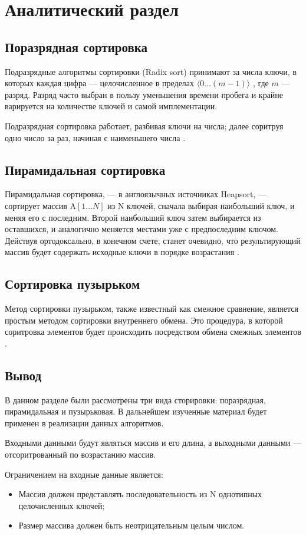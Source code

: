 \chapter{Аналитический раздел}
\label{cha:analysis}
%
%

\section{Поразрядная сортировка}
Подразрядные алгоритмы сортировки (Radix sort) принимают за числа ключи, в которых каждая цифра --- целочисленное в пределах $\langle 0\dots(m - 1) \rangle$
, где $m$ --- разряд. Разряд часто выбран в пользу уменьшения времени пробега и крайне варируется на количестве ключей и самой имплементации.

Подразрядная сортировка работает, разбивая ключи на числа; далее соритруя одно число за раз, начиная с наименьшего числа \cite{zagha1991radix}.
\section{Пирамидальная сортировка}
Пирамидальная сортировка, --- в англоязычных источниках Heapsort, --- сортирует массив $\text{A} [1\dots N]$ из $\text{N}$ ключей, сначала выбирая наибольший ключ, и меняя его с последним. Второй наибольший ключ затем выбирается из оставшихся, и аналогично меняется местами уже с предпоследним ключом. Действуя ортодоксально, в конечном счете, станет очевидно, что результирующий массив будет содержать исходные ключи в порядке возрастания \cite{schaffer1993analysis}.
\section{Сортировка пузырьком}
Метод сортировки пузырьком, также известный как смежное сравнение, является простым методом сортировки внутреннего обмена. Это процедура, в которой соритровка элементов будет происходить посредством обмена смежных элементов \cite{min2010analysis}. 

\section{Вывод}
В данном разделе были рассмотрены три вида сторировки: поразрядная, пирамидальная и пузырьковая. В дальнейшем изученные материал будет применен в реализации данных алгоритмов. 

Входными данными будут являться массив и его длина, а выходными данными --- отсоритрованный по возрастанию массив. 

Ограничением на входные данные является:
\begin{itemize}
    \item Массив должен представлять последовательность из N однотипных целочисленных ключей;
    \item Размер массива должен быть неотрицательным целым числом.
\end{itemize}

